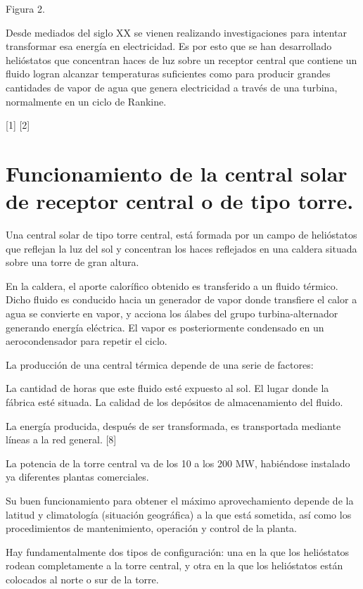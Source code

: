\documentclass[12pt]{article}
\begin{document}
Figura 2.

Desde mediados del siglo XX se vienen realizando investigaciones para intentar transformar esa energía en electricidad. Es por esto que se han desarrollado helióstatos que concentran haces de luz sobre un receptor central que contiene un fluido logran alcanzar temperaturas suficientes como para producir grandes cantidades de vapor de agua que genera electricidad a través de una turbina, normalmente en un ciclo de Rankine.

[1] [2]

\section{Funcionamiento de la central solar de receptor central o de tipo torre.}

Una central solar de tipo torre central, está formada por un campo de helióstatos que reflejan la luz del sol y concentran los haces reflejados en una caldera situada sobre una torre de gran altura.

En la caldera, el aporte calorífico obtenido es transferido a un fluido térmico. Dicho fluido es conducido hacia un generador de vapor donde transfiere el calor a agua se convierte en vapor, y acciona los álabes del grupo turbina-alternador generando energía eléctrica. El vapor es posteriormente condensado en un aerocondensador para repetir el ciclo.

La producción de una central térmica depende de una serie de factores:

La cantidad de horas que este fluido esté expuesto al sol.
El lugar donde la fábrica esté situada.
La calidad de los depósitos de almacenamiento del fluido.

La energía producida, después de ser transformada, es transportada mediante líneas a la red general. [8]

La potencia de la torre central va de los 10 a los 200 MW, habiéndose instalado ya diferentes plantas comerciales.

Su buen funcionamiento para obtener el máximo aprovechamiento depende de la latitud y climatología (situación geográfica) a la que está sometida, así como los procedimientos de mantenimiento, operación y control de la planta.

Hay fundamentalmente dos tipos de configuración: una en la que los helióstatos rodean completamente a la torre central, y otra en la que los helióstatos están colocados al norte o sur de la torre.
\end{document}
